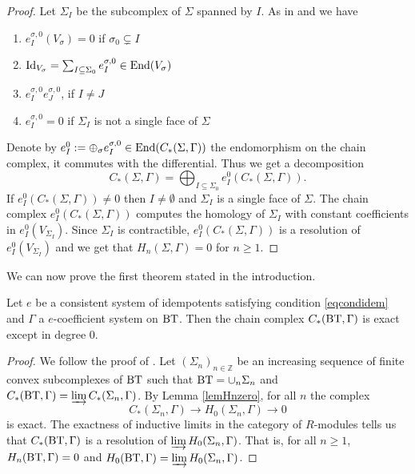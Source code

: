 \documentclass[a4paper,10pt]{amsart}
\begin{document}
\begin{proof}
Let $\Sigma_I$ be the subcomplex of $\Sigma$ spanned by $I$. As in \cite[Section 2.5]{meyer_resolutions_2010} and \cite[Prop. 2.4.1 (a)]{Wanga} we have
	\begin{enumerate}
		\item $e_I^{\sigma,0}(V_\sigma) = 0 $  if $\sigma_0 \subsetneq I$ 
		\item $\operatorname{Id}_{V_\sigma}=\sum_{I\subseteq \Sigma_0} e_I^{\sigma,0} \in \operatorname{End}(V_\sigma)$
		\item  $ e_I^{\sigma,0}  e_J^{\sigma,0}$, if $I\neq J$
		\item $ e_I^{\sigma,0}=0$ if $\Sigma_I$ is not a single face of $\Sigma$
	\end{enumerate}

	Denote by $e_I^{0} := \oplus_{\sigma}e_I^{\sigma,0} \in \operatorname{End}(C_{*}(\Sigma,\Gamma))$ the endomorphism on the chain complex, it commutes with the differential. Thus we get a decomposition
	\[
		C_{*}(\Sigma,\Gamma) = \bigoplus_{I\subseteq \Sigma_0} e_I^{0}(C_{*}(\Sigma,\Gamma)).
	\]
	If $e_I^{0}(C_{*}(\Sigma,\Gamma))\neq 0$ then $I \neq \emptyset$ and $\Sigma_I$ is a single face of $\Sigma$. The chain complex $ e_I^{0}(C_{*}(\Sigma,\Gamma))$ computes the homology of $\Sigma_I$ with constant coefficients in $e_I^{0}(V_{\Sigma_I})$. Since $\Sigma_I$ is contractible, $ e_I^{0}(C_{*}(\Sigma,\Gamma))$ is a resolution of $e_I^{0}(V_{\Sigma_I})$ and we get that $H_n(\Sigma,\Gamma)=0$ for $n\geq 1$.
\end{proof}


We can now prove the first theorem stated in the introduction.

\begin{The}
Let $e$ be a consistent system of idempotents satisfying condition \eqref{eqcondidem} and $\Gamma$ a $e$-coefficient system on $\bt$. Then the chain complex $C_{*}(\bt,\Gamma)$ is exact except in degree 0.
\end{The}

\begin{proof}
	We follow the proof of \cite[Section 2.5]{meyer_resolutions_2010}. Let $(\Sigma_n)_{n\in \mathbb{Z}}$ be an increasing sequence of  finite convex subcomplexes of $\bt$ such that $\bt=\cup_n \Sigma_n$ and $C_{*}(\bt,\Gamma) = \varinjlim C_{*}(\Sigma_n,\Gamma)$. By Lemma \ref{lemHnzero}, for all $n$ the complex
	\[
		C_{*}(\Sigma_n,\Gamma) \to H_0(\Sigma_n,\Gamma) \to 0
	\]
	is exact. The exactness of inductive limits in the category of $R$-modules tells us that $C_{*}(\bt,\Gamma)$ is a resolution of $\varinjlim H_0(\Sigma_n,\Gamma)$. That is, for all $n\geq 1$, $H_n(\bt,\Gamma)=0$ and $H_0(\bt,\Gamma)=\varinjlim H_0(\Sigma_n,\Gamma)$.
\end{proof}
\end{document}
